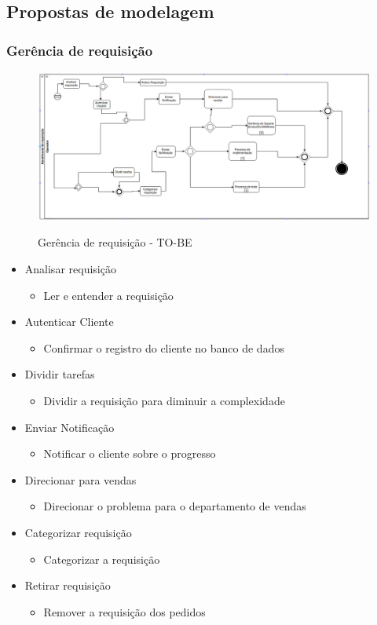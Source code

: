 \subsection{Propostas de modelagem}
\subsubsection{Gerência de requisição }
\begin{figure}[!h]
\caption{Gerência de requisição - TO-BE}
\centering %
\includegraphics[width=15cm]{to_be/01_atendimento_de_requisicao.png}
\label{figura:atendimento_requisicao_to_be}
\end{figure}

\begin{itemize}[noitemsep]
	\item Analisar requisição
		\begin{itemize}
			\item Ler e entender a requisição
		\end{itemize}
	\item Autenticar Cliente
		\begin{itemize}
			\item Confirmar o registro do cliente no banco de dados
		\end{itemize}
	\item Dividir tarefas
		\begin{itemize}
			\item Dividir a requisição para diminuir a complexidade
		\end{itemize}
	\item Enviar Notificação
		\begin{itemize}
			\item Notificar o cliente sobre o progresso
		\end{itemize}
	\item Direcionar para vendas
		\begin{itemize}
			\item Direcionar o problema para o departamento de vendas
		\end{itemize}
	\item Categorizar requisição
		\begin{itemize}
			\item Categorizar a requisição
		\end{itemize}
	\item Retirar requisição
		\begin{itemize}
			\item Remover a requisição dos pedidos
		\end{itemize}
\end{itemize}

